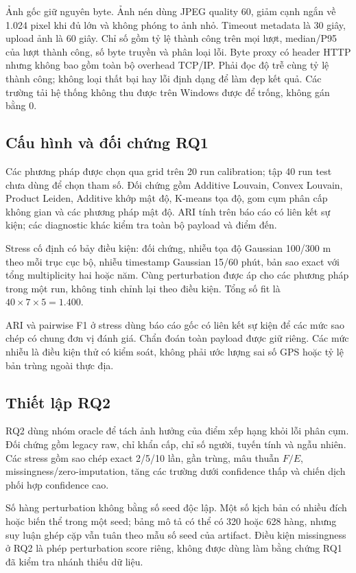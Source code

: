 Ảnh gốc giữ nguyên byte. Ảnh nén dùng JPEG quality 60, giảm cạnh ngắn về 1.024 pixel khi đủ lớn và không phóng to ảnh nhỏ. Timeout metadata là 30 giây, upload ảnh là 60 giây. Chỉ số gồm tỷ lệ thành công trên mọi lượt, median/P95 của lượt thành công, số byte truyền và phân loại lỗi. Byte proxy có header HTTP nhưng không bao gồm toàn bộ overhead TCP/IP. Phải đọc độ trễ cùng tỷ lệ thành công; không loại thất bại hay lỗi định dạng để làm đẹp kết quả. Các trường tải hệ thống không thu được trên Windows được để trống, không gán bằng 0.

\subsection{Cấu hình và đối chứng RQ1}
Các phương pháp được chọn qua grid trên 20 run calibration; tập 40 run test chưa dùng để chọn tham số. Đối chứng gồm Additive Louvain, Convex Louvain, Product Leiden, Additive khớp mật độ, K-means tọa độ, gom cụm phân cấp không gian và các phương pháp mật độ. ARI tính trên báo cáo có liên kết sự kiện; các diagnostic khác kiểm tra toàn bộ payload và điểm đến.

Stress cố định có bảy điều kiện: đối chứng, nhiễu tọa độ Gaussian 100/300 m theo mỗi trục cục bộ, nhiễu timestamp Gaussian 15/60 phút, bản sao exact với tổng multiplicity hai hoặc năm. Cùng perturbation được áp cho các phương pháp trong một run, không tinh chỉnh lại theo điều kiện. Tổng số fit là $40\times7\times5=1.400$.

ARI và pairwise F1 ở stress dùng báo cáo gốc có liên kết sự kiện để các mức sao chép có chung đơn vị đánh giá. Chẩn đoán toàn payload được giữ riêng. Các mức nhiễu là điều kiện thử có kiểm soát, không phải ước lượng sai số GPS hoặc tỷ lệ bản trùng ngoài thực địa.

\subsection{Thiết lập RQ2}
RQ2 dùng nhóm oracle để tách ảnh hưởng của điểm xếp hạng khỏi lỗi phân cụm. Đối chứng gồm legacy raw, chỉ khẩn cấp, chỉ số người, tuyến tính và ngẫu nhiên. Các stress gồm sao chép exact 2/5/10 lần, gần trùng, mâu thuẫn $F/E$, missingness/zero-imputation, tăng các trường dưới confidence thấp và chiến dịch phối hợp confidence cao.

Số hàng perturbation không bằng số seed độc lập. Một số kịch bản có nhiều đích hoặc biến thể trong một seed; bảng mô tả có thể có 320 hoặc 628 hàng, nhưng suy luận ghép cặp vẫn tuân theo mẫu số seed của artifact. Điều kiện missingness ở RQ2 là phép perturbation score riêng, không được dùng làm bằng chứng RQ1 đã kiểm tra nhánh thiếu dữ liệu.

